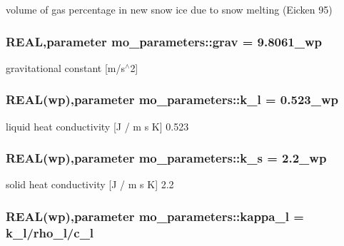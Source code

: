 volume of gas percentage in new snow ice due to snow melting (Eicken 95) 

\hypertarget{namespacemo__parameters_adb294212d96151a282d82819bb97de4b}{
\subsubsection[{grav}]{\setlength{\rightskip}{0pt plus 5cm}REAL,parameter {\bf mo\_\-parameters::grav} = 9.8061\_\-wp}}
\label{namespacemo__parameters_adb294212d96151a282d82819bb97de4b}


gravitational constant \mbox{[}m/s$^\wedge$2\mbox{]} 

\hypertarget{namespacemo__parameters_aee1eca61b39f2038e51bfe41f1fbd574}{
\subsubsection[{k\_\-l}]{\setlength{\rightskip}{0pt plus 5cm}REAL({\bf wp}),parameter {\bf mo\_\-parameters::k\_\-l} = 0.523\_\-wp}}
\label{namespacemo__parameters_aee1eca61b39f2038e51bfe41f1fbd574}


liquid heat conductivity \mbox{[}J / m s K\mbox{]} 0.523 

\hypertarget{namespacemo__parameters_ac0fbc3357bfcbb03857942aeefb16090}{
\subsubsection[{k\_\-s}]{\setlength{\rightskip}{0pt plus 5cm}REAL({\bf wp}),parameter {\bf mo\_\-parameters::k\_\-s} = 2.2\_\-wp}}
\label{namespacemo__parameters_ac0fbc3357bfcbb03857942aeefb16090}


solid heat conductivity \mbox{[}J / m s K\mbox{]} 2.2 

\hypertarget{namespacemo__parameters_a5355c60cba43613d845739fba4c9e0af}{
\subsubsection[{kappa\_\-l}]{\setlength{\rightskip}{0pt plus 5cm}REAL({\bf wp}),parameter {\bf mo\_\-parameters::kappa\_\-l} = {\bf k\_\-l}/{\bf rho\_\-l}/{\bf c\_\-l}}}
\label{namespacemo__parameters_a5355c60cba43613d845739fba4c9e0af}


